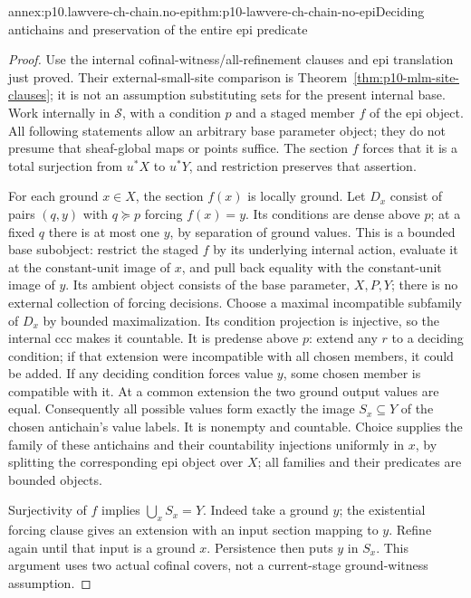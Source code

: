 \begin{annexitem}{annex:p10.lawvere-ch-chain.no-epi}{thm:p10-lawvere-ch-chain-no-epi}{Deciding antichains and preservation of the entire epi predicate}
\begin{proof}
Use the internal cofinal-witness/all-refinement clauses and epi
translation just proved. Their external-small-site comparison is
Theorem~\ref{thm:p10-mlm-site-clauses}; it is not an assumption
substituting sets for the present internal base.
Work internally in
\(\mathcal S\), with a condition \(p\) and a staged member \(f\) of
the epi object. All following statements allow an arbitrary base parameter
object; they do not presume that sheaf-global maps or points suffice.
The section \(f\) forces that it is a total surjection from \(u^*X\)
to \(u^*Y\), and restriction preserves that assertion.

For each ground \(x\in X\), the section \(f(x)\) is locally ground.
Let \(D_x\) consist of pairs \((q,y)\) with \(q\succeq p\) forcing
\(f(x)=y\). Its conditions are dense above \(p\); at a fixed \(q\)
there is at most one \(y\), by separation of ground values.
This is a bounded base subobject: restrict the staged \(f\) by its
underlying internal action, evaluate it at the constant-unit image
of \(x\), and pull back equality with the constant-unit image of \(y\).
Its ambient object consists of the base parameter, \(X,P,Y\);
there is no external collection of forcing decisions.
Choose a maximal incompatible subfamily of \(D_x\) by bounded
maximalization. Its condition projection is injective, so the internal
ccc makes it countable. It is predense above \(p\): extend any \(r\)
to a deciding condition; if that extension were incompatible with all
chosen members, it could be added. If any deciding condition forces
value \(y\), some chosen member is compatible with it. At a common
extension the two ground output values are equal. Consequently all
possible values form exactly the image \(S_x\subseteq Y\) of the
chosen antichain's value labels. It is nonempty and countable.
Choice supplies the family of these antichains and their countability
injections uniformly in \(x\), by splitting the corresponding epi
object over \(X\); all families and their predicates are bounded objects.

Surjectivity of \(f\) implies \(\bigcup_xS_x=Y\).
Indeed take a ground \(y\); the existential forcing clause gives an
extension with an input section mapping to \(y\). Refine again until
that input is a ground \(x\). Persistence then puts \(y\) in \(S_x\).
This argument uses two actual cofinal covers, not a current-stage
ground-witness assumption.


\end{proof}
\end{annexitem}
